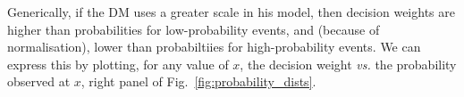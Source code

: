 \documentclass[a4paper, 12pt]{article}
\newcommand{\flabel}[1]{\label{fig:#1}}
\newcommand{\fref}[1]{Fig.~\ref{fig:#1}}
\newcommand{\Secref}[1]{Section~\ref{sec:#1}}
\newcommand{\ND}{\mathcal{N}} %
\begin{document}
%
%
%

Generically, if the DM uses a greater scale in his model, then decision weights are higher than probabilities for low-probability events, and (because of normalisation), lower than probabiltiies for high-probability events. We can express this by plotting, for any value of $x$, the decision weight {\it vs.} the probability observed at $x$, right panel of \fref{probability_dists}.

\end{document}
